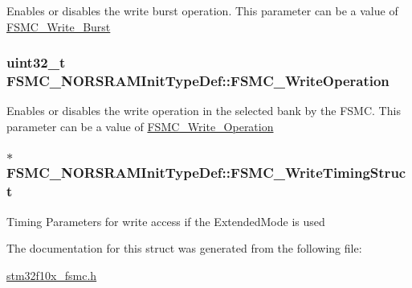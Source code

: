 \label{structFSMC__NORSRAMInitTypeDef_adac3756711f2d76e56a8cbcb7a03843d}
Enables or disables the write burst operation. This parameter can be a value of \hyperlink{group__FSMC__Write__Burst}{FSMC\_\-Write\_\-Burst} \hypertarget{structFSMC__NORSRAMInitTypeDef_a596793d1735c4e38c87e3bf91d986370}{
\subsubsection[{FSMC\_\-WriteOperation}]{\setlength{\rightskip}{0pt plus 5cm}uint32\_\-t {\bf FSMC\_\-NORSRAMInitTypeDef::FSMC\_\-WriteOperation}}}
\label{structFSMC__NORSRAMInitTypeDef_a596793d1735c4e38c87e3bf91d986370}
Enables or disables the write operation in the selected bank by the FSMC. This parameter can be a value of \hyperlink{group__FSMC__Write__Operation}{FSMC\_\-Write\_\-Operation} \hypertarget{structFSMC__NORSRAMInitTypeDef_ac62cf7426a933ce6aa6efc3a8e82dac1}{
\subsubsection[{FSMC\_\-WriteTimingStruct}]{$\ast$ {\bf FSMC\_\-NORSRAMInitTypeDef::FSMC\_\-WriteTimingStruct}}}
\label{structFSMC__NORSRAMInitTypeDef_ac62cf7426a933ce6aa6efc3a8e82dac1}
Timing Parameters for write access if the ExtendedMode is used 

The documentation for this struct was generated from the following file:\begin{DoxyCompactItemize}
\item 
\hyperlink{stm32f10x__fsmc_8h}{stm32f10x\_\-fsmc.h}\end{DoxyCompactItemize}
